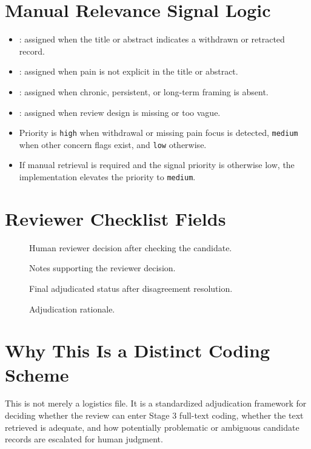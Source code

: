 \documentclass[11pt]{article}
\begin{document}
\section*{Manual Relevance Signal Logic}
\begin{itemize}
\item {}: assigned when the title or abstract indicates a withdrawn or retracted record.
\item {}: assigned when pain is not explicit in the title or abstract.
\item {}: assigned when chronic, persistent, or long-term framing is absent.
\item {}: assigned when review design is missing or too vague.
\item Priority is \texttt{high} when withdrawal or missing pain focus is detected, \texttt{medium} when other concern flags exist, and \texttt{low} otherwise.
\item If manual retrieval is required and the signal priority is otherwise low, the implementation elevates the priority to \texttt{medium}.
\end{itemize}

\section*{Reviewer Checklist Fields}
\begin{description}
\item[] Human reviewer decision after checking the candidate.
\item[] Notes supporting the reviewer decision.
\item[] Final adjudicated status after disagreement resolution.
\item[] Adjudication rationale.
\end{description}

\section*{Why This Is a Distinct Coding Scheme}
This is not merely a logistics file. It is a standardized adjudication framework for deciding whether the review can enter Stage 3 full-text coding, whether the text retrieved is adequate, and how potentially problematic or ambiguous candidate records are escalated for human judgment.
\end{document}
